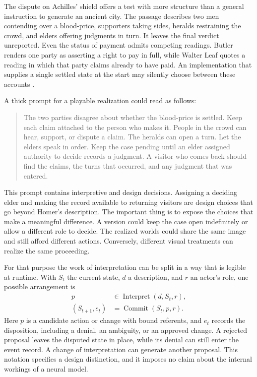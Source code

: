 \documentclass[11pt,letterpaper]{article}
\begin{document}
The dispute on Achilles’ shield offers a test with more structure than a general instruction to generate an ancient city. The passage describes two men contending over a blood-price, supporters taking sides, heralds restraining the crowd, and elders offering judgments in turn. It leaves the final verdict unreported. Even the status of payment admits competing readings. Butler renders one party as asserting a right to pay in full, while Walter Leaf quotes a reading in which that party claims already to have paid. An implementation that supplies a single settled state at the start may silently choose between these accounts \citep[18.497--508]{HomerButler}\citep{Leaf1887}.

A thick prompt for a playable realization could read as follows:

\begin{quote}
The two parties disagree about whether the blood-price is settled. Keep each claim attached to the person who makes it. People in the crowd can hear, support, or dispute a claim. The heralds can open a turn. Let the elders speak in order. Keep the case pending until an elder assigned authority to decide records a judgment. A visitor who comes back should find the claims, the turns that occurred, and any judgment that was entered.
\end{quote}

This prompt contains interpretive and design decisions. Assigning a deciding elder and making the record available to returning visitors are design choices that go beyond Homer’s description. The important thing is to expose the choices that make a meaningful difference. A version could keep the case open indefinitely or allow a different role to decide. The realized worlds could share the same image and still afford different actions. Conversely, different visual treatments can realize the same proceeding.

For that purpose the work of interpretation can be split in a way that is legible at runtime. With \(S_t\) the current state, \(d\) a description, and \(r\) an actor’s role, one possible arrangement is
\[
\begin{aligned}
 p &\in \operatorname{Interpret}(d,S_t,r), \\
 (S_{t+1},e_t) &= \operatorname{Commit}(S_t,p,r).
\end{aligned}
\]
Here \(p\) is a candidate action or change with bound referents, and \(e_t\) records the disposition, including a denial, an ambiguity, or an approved change. A rejected proposal leaves the disputed state in place, while its denial can still enter the event record. A change of interpretation can generate another proposal. This notation specifies a design distinction, and it imposes no claim about the internal workings of a neural model.
\end{document}
